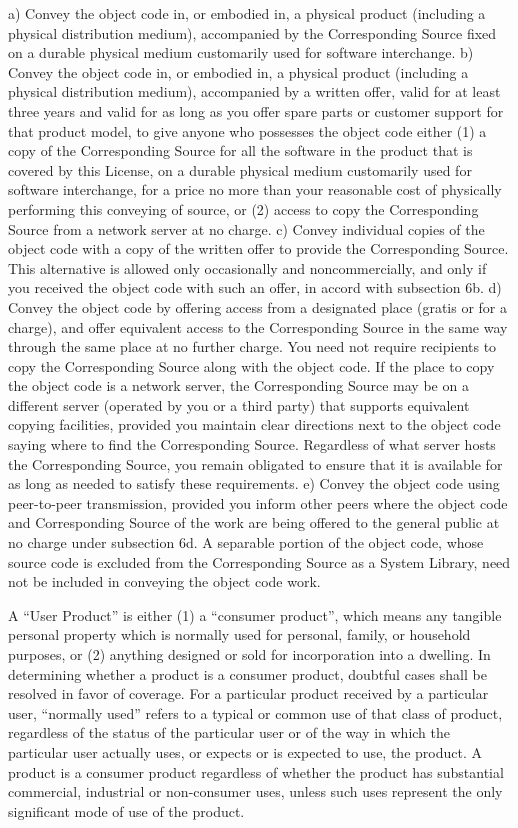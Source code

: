 \documentclass[11pt]{article}
\begin{document}
a) Convey the object code in, or embodied in, a physical product (including a physical distribution medium), accompanied by the Corresponding Source fixed on a durable physical medium customarily used for software interchange.
b) Convey the object code in, or embodied in, a physical product (including a physical distribution medium), accompanied by a written offer, valid for at least three years and valid for as long as you offer spare parts or customer support for that product model, to give anyone who possesses the object code either (1) a copy of the Corresponding Source for all the software in the product that is covered by this License, on a durable physical medium customarily used for software interchange, for a price no more than your reasonable cost of physically performing this conveying of source, or (2) access to copy the Corresponding Source from a network server at no charge.
c) Convey individual copies of the object code with a copy of the written offer to provide the Corresponding Source. This alternative is allowed only occasionally and noncommercially, and only if you received the object code with such an offer, in accord with subsection 6b.
d) Convey the object code by offering access from a designated place (gratis or for a charge), and offer equivalent access to the Corresponding Source in the same way through the same place at no further charge. You need not require recipients to copy the Corresponding Source along with the object code. If the place to copy the object code is a network server, the Corresponding Source may be on a different server (operated by you or a third party) that supports equivalent copying facilities, provided you maintain clear directions next to the object code saying where to find the Corresponding Source. Regardless of what server hosts the Corresponding Source, you remain obligated to ensure that it is available for as long as needed to satisfy these requirements.
e) Convey the object code using peer-to-peer transmission, provided you inform other peers where the object code and Corresponding Source of the work are being offered to the general public at no charge under subsection 6d.
A separable portion of the object code, whose source code is excluded from the Corresponding Source as a System Library, need not be included in conveying the object code work.

A “User Product” is either (1) a “consumer product”, which means any tangible personal property which is normally used for personal, family, or household purposes, or (2) anything designed or sold for incorporation into a dwelling. In determining whether a product is a consumer product, doubtful cases shall be resolved in favor of coverage. For a particular product received by a particular user, “normally used” refers to a typical or common use of that class of product, regardless of the status of the particular user or of the way in which the particular user actually uses, or expects or is expected to use, the product. A product is a consumer product regardless of whether the product has substantial commercial, industrial or non-consumer uses, unless such uses represent the only significant mode of use of the product.
\end{document}
